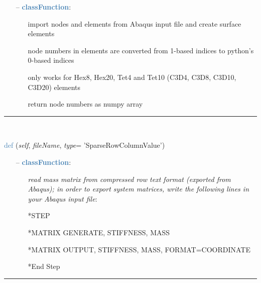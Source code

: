 \begin{itemize}[leftmargin=1.4cm]
\begin{itemize}[leftmargin=0.5cm]
\begin{itemize}[leftmargin=1.4cm]
\begin{itemize}[leftmargin=0.5cm]
\begin{itemize}[leftmargin=0.7cm]
  \item[--]  \textcolor{steelblue}{\bf classFunction}: \vspace{-6pt}
  \begin{itemize}[leftmargin=1.2cm]
\setlength{\itemindent}{-0.7cm}
    \item[] import nodes and elements from Abaqus input file and create surface elements
    \item[] node numbers in elements are converted from 1-based indices to python's 0-based indices
    \item[] only works for Hex8, Hex20, Tet4 and Tet10 (C3D4, C3D8, C3D10, C3D20) elements
    \item[] return node numbers as numpy array
  \end{itemize}
\vspace{12pt}\end{itemize}
%
\noindent\rule{8cm}{0.75pt}\vspace{1pt} \\ 
\begin{flushleft}
\noindent \textcolor{steelblue}{def {\bf {}}}\label{sec:FEM:FEMinterface:ReadMassMatrixFromAbaqus}
({\it self}, {\it fileName}, {\it type}= 'SparseRowColumnValue')
\end{flushleft}
\setlength{\itemindent}{0.7cm}
\begin{itemize}[leftmargin=0.7cm]
  \item[--]  \textcolor{steelblue}{\bf classFunction}: \vspace{-6pt}
  \begin{itemize}[leftmargin=1.2cm]
\setlength{\itemindent}{-0.7cm}
    \item[] {\it read mass matrix from compressed row text format (exported from Abaqus); in order to export system matrices, write the following lines in your Abaqus input file}:
    \item[] *STEP
    \item[] *MATRIX GENERATE, STIFFNESS, MASS
    \item[] *MATRIX OUTPUT, STIFFNESS, MASS, FORMAT=COORDINATE
    \item[] *End Step
  \end{itemize}
\vspace{12pt}\end{itemize}
%
\noindent\rule{8cm}{0.75pt}\vspace{1pt} \\ 

\end{itemize}
\end{itemize}
\end{itemize}
\end{itemize}
